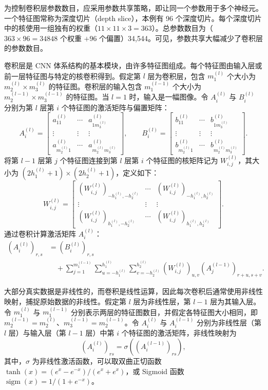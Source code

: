 为控制卷积层参数数目，应采用参数共享策略，即让同一个参数用于多个神经元。一个特征图常称为深度切片（depth slice），本例有 96 个深度切片。每个深度切片中的核使用一组独有的权重（$11\times11\times3=363$）。总参数数目为（$363\times96=34848$ 个权重 $+96$ 个偏置）34,544。可见，参数共享大幅减少了卷积层的参数数目。

卷积层是 CNN 体系结构的基本模块，由许多特征图组成。每个特征图由输入层或前一层特征图与特定的核卷积得到。假定第 $l$ 层为卷积层，包含 $m_1^{(l)}$ 个大小为 $m_2^{(l)}\times m_3^{(l)}$ 的特征图。卷积层的输入包含 $m_1^{(l-1)}$ 个大小为 $m_2^{(l-1)}\times m_3^{(l-1)}$ 的特征图。当 $l=1$ 时，输入是一幅图像。令 $A_i^{(l)}$ 与 $B_i^{(l)}$ 分别为第 $l$ 层第 $i$ 个特征图的激活矩阵与偏置矩阵：
\[
A_i^{(l)}=\begin{bmatrix}
a_{11}^{(l)}&\cdots&a_{1m_3^{(l)}}^{(l)}\\
\vdots&\vdots&\vdots\\
a_{m_2^{(l)}1}^{(l)}&\cdots&a_{m_2^{(l)}m_3^{(l)}}^{(l)}
\end{bmatrix},\qquad
B_i^{(l)}=\begin{bmatrix}
b_{11}^{(l)}&\cdots&b_{1m_3^{(l)}}^{(l)}\\
\vdots&\vdots&\vdots\\
b_{m_2^{(l)}1}^{(l)}&\cdots&b_{m_2^{(l)}m_3^{(l)}}^{(l)}
\end{bmatrix}.
\]
将第 $l-1$ 层第 $j$ 个特征图连接到第 $l$ 层第 $i$ 个特征图的核矩阵记为 $W_{i,j}^{(l)}$，其大小为 $(2h_1^{(l)}+1)\times(2h_2^{(l)}+1)$，定义如下：
\[
W_{i,j}^{(l)}=\begin{bmatrix}
(W_{i,j}^{(l)})_{-h_1^{(l)},-h_2^{(l)}}&\cdots&(W_{i,j}^{(l)})_{-h_1^{(l)},h_2^{(l)}}\\
\vdots&\vdots&\vdots\\
(W_{i,j}^{(l)})_{h_1^{(l)},-h_2^{(l)}}&\cdots&(W_{i,j}^{(l)})_{h_1^{(l)},h_2^{(l)}}
\end{bmatrix}.
\]
通过卷积计算激活矩阵 $A_i^{(l)}$：
\begin{equation}
\begin{aligned}
(A_i^{(l)})_{r,s}&=(B_i^{(l)})_{r,s}\\
&\quad+\sum_{j=1}^{m_1^{(l-1)}}\sum_{u=-h_1^{(l)}}^{h_1^{(l)}}\sum_{v=-h_2^{(l)}}^{h_2^{(l)}}
(W_{i,j}^{(l)})_{u,v}(A_j^{(l-1)})_{r+u,s+v}.
\end{aligned}\tag{6.91}
\end{equation}


大部分真实数据是非线性的，而卷积是线性运算，因此每次卷积后通常使用非线性映射，捕捉原始数据的非线性。假定第 $l$ 层为非线性层，第 $l-1$ 层为其输入层。令 $m_1^{(l)}$ 与 $m_1^{(l-1)}$ 分别表示两层的特征图数目，并假定各特征图大小相同，即 $m_2^{(l-1)}=m_2^{(l)}$、$m_3^{(l-1)}=m_2^{(l-1)}$。令 $A_i^{(l)}$ 与 $A_i^{(l-1)}$ 分别为非线性层（第 $l$ 层）与输入层（第 $l-1$ 层）中第 $i$ 个特征图的激活矩阵，非线性映射为
\begin{equation}
(A_i^{(l)})_{rs}=\sigma((A_i^{(l-1)})_{rs}),
\tag{6.92}
\end{equation}
其中，$\sigma$ 为非线性激活函数，可以取双曲正切函数 $\tanh(x)=(e^x-e^{-x})/(e^x+e^x)$，或 Sigmoid 函数 $\operatorname{sigm}(x)=1/(1+e^{-x})$。

